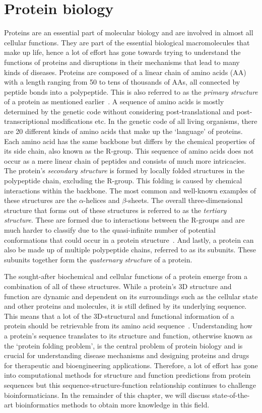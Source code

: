 \section{Protein biology}
Proteins are an essential part of molecular biology and are involved in almost all cellular functions. They are part of the essential biological macromolecules that make up life, hence a lot of effort has gone towards trying to understand the functions of proteins and disruptions in their mechanisms that lead to many kinds of diseases. Proteins are composed of a linear chain of amino acids (AA) with a length ranging from 50 to tens of thousands of AAs, all connected by peptide bonds into a polypeptide. This is also referred to as the \textit{primary structure} of a protein as mentioned earlier~\cite{primstruct}. A sequence of amino acids is mostly determined by the genetic code without considering post-translational and post-transcriptional modifications etc. In the genetic code of all living organisms, there are 20 different kinds of amino acids that make up the `language' of proteins. Each amino acid has the same backbone but differs by the chemical properties of its side chain, also known as the R-group. This sequence of amino acids does not occur as a mere linear chain of peptides and consists of much more intricacies. The protein's \textit{secondary structure} is formed by locally folded structures in the polypeptide chain, excluding the R-group. This folding is caused by chemical interactions within the backbone. The most common and well-known examples of these structures are the $\alpha$-helices and $\beta$-sheets. The overall three-dimensional structure that forms out of these structures is referred to as the \textit{tertiary structure}. These are formed due to interactions between the R-groups and are much harder to classify due to the quasi-infinite number of potential conformations that could occur in a protein structure~\cite{folding}. And lastly, a protein can also be made up of multiple polypeptide chains, referred to as its subunits. These subunits together form the \textit{quaternary structure} of a protein.

The sought-after biochemical and cellular functions of a protein emerge from a combination of all of these structures. While a protein's 3D structure and function are dynamic and dependent on its surroundings such as the cellular state and other proteins and molecules, it is still defined by its underlying sequence. This means that a lot of the 3D-structural and functional information of a protein should be retrievable from its amino acid sequence~\cite{structure}. Understanding how a protein's sequence translates to its structure and function, otherwise known as the `protein folding problem', is the central problem of protein biology and is crucial for understanding disease mechanisms and designing proteins and drugs for therapeutic and bioengineering applications. Therefore, a lot of effort has gone into computational methods for structure and function predictions from protein sequences but this sequence-structure-function relationship continues to challenge bioinformaticians. In the remainder of this chapter, we will discuss state-of-the-art bioinformatics methods to obtain more knowledge in this field.

